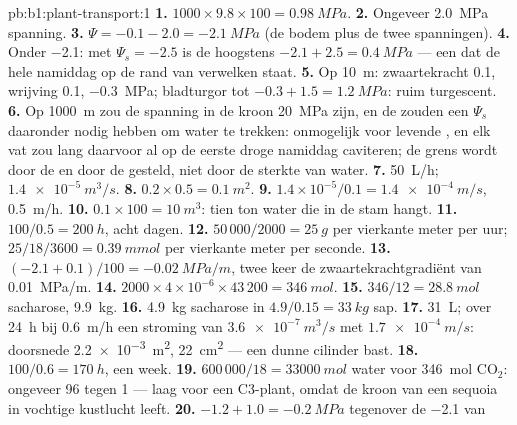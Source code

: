 \begin{solution}{pb:b1:plant-transport:1}
\textbf{1.} $1000\times 9.8\times 100 = \qty{0.98}{MPa}$.
\textbf{2.} Ongeveer \qty{2.0}{MPa} spanning.
\textbf{3.} $\Psi = -0.1 - 2.0 = \qty{-2.1}{MPa}$ (de bodem plus de twee
spanningen).
\textbf{4.} Onder \qty{-2.1}{}: met $\Psi_s = -2.5$ is de  hoogstens
$-2.1 + 2.5 = \qty{0.4}{MPa}$ --- een  dat de hele namiddag op de rand
van verwelken staat.
\textbf{5.} Op \qty{10}{m}: zwaartekracht \qty{0.1}{}, wrijving
\qty{0.1}{},  \qty{-0.3}{MPa}; bladturgor tot $-0.3 + 1.5 = \qty{1.2}{MPa}$:
ruim turgescent.
\textbf{6.} Op \qty{1000}{m} zou de spanning in de kroon \qty{20}{MPa} zijn,
en de  zouden een $\Psi_s$ daaronder nodig hebben om water te
trekken: onmogelijk voor levende , en elk vat zou lang daarvoor al op
de eerste droge namiddag caviteren; de grens wordt door de  en door
de  gesteld, niet door de sterkte van water.
\textbf{7.} \qty{50}{L/h}; $\qty{1.4e-5}{m^3/s}$.
\textbf{8.} $0.2\times 0.5 = \qty{0.1}{m^2}$.
\textbf{9.} $1.4\times 10^{-5}/0.1 = \qty{1.4e-4}{m/s}$, \qty{0.5}{m/h}.
\textbf{10.} $0.1\times 100 = \qty{10}{m^3}$: tien ton water die in de stam hangt.
\textbf{11.} $100/0.5 = \qty{200}{h}$, acht dagen.
\textbf{12.} $50\,000/2000 = \qty{25}{g}$ per vierkante meter per uur;
$25/18/3600 = \qty{0.39}{mmol}$ per vierkante meter per seconde.
\textbf{13.} $(-2.1 + 0.1)/100 = \qty{-0.02}{MPa/m}$, twee keer de
zwaartekrachtgradiënt van \qty{0.01}{MPa/m}.
\textbf{14.} $2000\times 4\times 10^{-6}\times 43\,200 = \qty{346}{mol}$.
\textbf{15.} $346/12 = \qty{28.8}{mol}$ sacharose, \qty{9.9}{kg}.
\textbf{16.} \qty{4.9}{kg} sacharose in $4.9/0.15 = \qty{33}{kg}$ sap.
\textbf{17.} \qty{31}{L}; over \qty{24}{h} bij \qty{0.6}{m/h} een stroming
van $\qty{3.6e-7}{m^3/s}$ met $\qty{1.7e-4}{m/s}$: doorsnede
\qty{2.2e-3}{m^2}, \qty{22}{cm^2}  --- een dunne cilinder
bast.
\textbf{18.} $100/0.6 = \qty{170}{h}$, een week.
\textbf{19.} $600\,000/18 = \qty{33000}{mol}$ water voor
\qty{346}{mol} $\mathrm{CO_2}$: ongeveer 96 tegen 1 --- laag voor een
C3-plant, omdat de kroon van een sequoia in vochtige kustlucht leeft.
\textbf{20.} $-1.2 + 1.0 = \qty{-0.2}{MPa}$ tegenover de \qty{-2.1}{} van

\end{solution}
